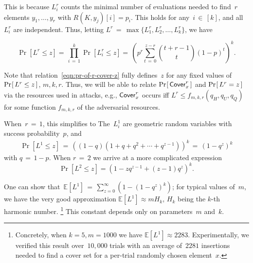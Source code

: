 This is because $L^r_i$ counts the minimal number of evaluations needed to find~$r$ elements $y_1, {\dots}, y_r$ with $R(K,y_j)[i]=p_i$.
This holds for any~$i \,{\in}\,  [k]$, and all~$L^r_i$ are independent.
%
Thus, letting $L^r\,{=}\, \max\{L^r_1,L^r_2,{\dots},L^r_k\}$, we have 

\begin{equation}	
\Pr[ L^r \leq z ]{=}\, \prod_{i\,{=}\, 1}^{k} \Pr[L^r_i \leq z]{=}\, \left(p^{r} \sum_{t\,{=}\, 0}^{z-r}\binom{t+r-1}{t}(1-p)^t\right)^k{.}
\label{eqn:pr-of-r-cover-z}
\end{equation}
%

Note that relation~\eqref{eqn:pr-of-r-cover-z} fully defines~$z$ for any fixed values of $\Pr\hspace{-1pt}\left[\,L^r \leq z\,\right]$, $m, k, r$.  
Thus, we will be able to relate $\Pr\hspace{-1pt}\left[\,\mathsf{Cover}^{r}_{x}\,\right]$ and $\Pr\hspace{-1pt}\left[\,L^r=z\,\right]$ via the resources used in attacks, e.g., $\mathsf{Cover}^{r}_{x}$ occurs iff $L^r \leq f_{m,k,r}(q_H,q_U,q_Q)$ for some function $f_{m,k,r}$ of the adversarial resources. 

When~$r\,{=}\, 1$, this simplifies to
The~$L^1_i$ are geometric random variables with success probability~$p$, and 
\begin{eqnarray}
\Pr[ L^1 \leq z ] \,{=}\,  \left((1-q)(1+q+q^2+\cdots + q^{z-1})\right)^k \,{=}\,(1-q^z)^k
\label{eqn:pr-of-1-cover-z}
\end{eqnarray}
with $q\,{=}\, 1-p$.
When $r\,{=}\,2$ we arrive at a more complicated expression 
\begin{equation}
\Pr[L^2 \leq z] = (1- zq^{z-1} +(z-1)q^z  )^k.
\label{eqn:pr-of-2-cover-z}
\end{equation}

One can show that~$\mathbb{E}[L^1]\,{=}\, \sum_{z=0}^{\infty} (1 - (1-q^z)^k)$; for typical values of~$m$, we have the very good approximation $ \mathbb{E}[L^1] \approx m H_k$, $H_k$ being the $k$-th harmonic number.
\footnote{Concretely, when $k=5,m=1000$ we have $\mathbb{E}[L^1]\approx 2283$. Experimentally, we verified this result over~$10,000$ trials with an average of~$2281$ insertions needed to find a cover set for a per-trial randomly chosen element~$x$.}  
This constant depends only on parameters~$m$ and~$k$.